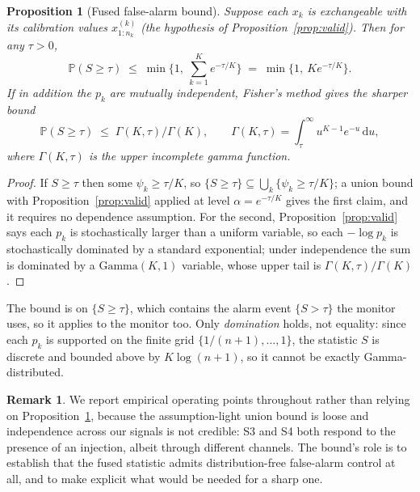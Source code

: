 \documentclass[preprint,12pt,number]{elsarticle}
\newtheorem{proposition}[theorem]{Proposition}
\theoremstyle{definition}
\newtheorem{remark}{Remark}
\newcommand{\Prob}{\mathbb{P}}
\begin{document}
\begin{proposition}[Fused false-alarm bound]\label{prop:fusebound}
Suppose each $x_k$ is exchangeable with its calibration values
$x^{(k)}_{1:n_k}$ (the hypothesis of Proposition~\ref{prop:valid}). Then for any
$\tau > 0$,
\begin{equation}
\Prob(S \ge \tau) \;\le\; \min\Big\{1,\ \sum_{k=1}^{K} e^{-\tau/K} \Big\}
\;=\; \min\{1,\ K e^{-\tau/K}\}.
\end{equation}
If in addition the $p_k$ are mutually independent, Fisher's method gives the
sharper bound
\begin{equation}\label{eq:fisherbound}
\Prob(S \ge \tau) \;\le\; \Gamma(K,\tau)/\Gamma(K),
\qquad
\Gamma(K,\tau) = \int_\tau^\infty u^{K-1}e^{-u}\,\mathrm{d}u ,
\end{equation}
where $\Gamma(K,\tau)$ is the upper incomplete gamma function.
\end{proposition}

\begin{proof}
If $S \ge \tau$ then some $\psi_k \ge \tau/K$, so
$\{S \ge \tau\} \subseteq \bigcup_k \{\psi_k \ge \tau/K\}$; a union bound with
Proposition~\ref{prop:valid} applied at level $\alpha = e^{-\tau/K}$ gives the
first claim, and it requires no dependence assumption. For the second,
Proposition~\ref{prop:valid} says each $p_k$ is stochastically larger than a
uniform variable, so each $-\log p_k$ is stochastically dominated by a standard
exponential; under independence the sum is dominated by a $\mathrm{Gamma}(K,1)$
variable, whose upper tail is $\Gamma(K,\tau)/\Gamma(K)$.
\end{proof}

The bound is on $\{S \ge \tau\}$, which contains the alarm event $\{S > \tau\}$ the
monitor uses, so it applies to the monitor too.
Only \emph{domination} holds, not equality: since each $p_k$ is supported on the
finite grid $\{1/(n{+}1),\dots,1\}$, the statistic $S$ is discrete and bounded
above by $K\log(n{+}1)$, so it cannot be exactly Gamma-distributed.

\begin{remark}
We report empirical operating points throughout rather than relying on
Proposition~\ref{prop:fusebound}, because the assumption-light union bound is
loose and independence across our signals is not credible: S3 and S4 both respond
to the presence of an injection, albeit through different channels. The bound's
role is to establish that the fused statistic admits distribution-free
false-alarm control at all, and to make explicit what would be needed for a sharp
one.
\end{remark}
\end{document}
